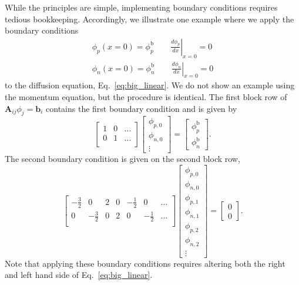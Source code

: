 \documentclass[journal=mamobx,manuscript=suppinfo]{achemso}
\newcommand{\txtb}{\mathrm{b}}
\begin{document}
While the principles are simple, implementing boundary conditions requires tedious bookkeeping.
Accordingly, we illustrate one example where we apply the boundary conditions
\begin{gather}
\phi_{p}(x=0) = \phi_{p}^{\txtb} \qquad \left . \frac{d \phi_{p}}{dx} \right |_{x=0} = 0  \\
\phi_{n}(x=0) = \phi_{n}^{\txtb} \qquad \left . \frac{d \phi_{n}}{dx} \right |_{x=0} = 0 
\end{gather}
to the diffusion equation, Eq.~\ref{eq:big_linear}.
We do not show an example using the momentum equation, but the procedure is identical.
The first block row of $\bm{A}_{ij} \phi_{j} = \bm{b}_{i}$ contains the first boundary condition and is given by
\begin{equation}
\begin{bmatrix}
  1 & 0 & \ldots \\
  0 & 1 & \ldots \\
\end{bmatrix}
\begin{bmatrix}
  \phi_{p, 0} \\
  \phi_{n, 0} \\
  \vdots
\end{bmatrix}
=
\begin{bmatrix}
  \phi_{p}^{\txtb} \\
  \phi_{n}^{\txtb}
\end{bmatrix}
\textrm{.}
\end{equation}
The second boundary condition is given on the second block row,
\begin{equation}
\begin{bmatrix}
  -\frac{3}{2} & 0 & 2 & 0 & -\frac{1}{2} & 0 & \ldots \\
  0 & -\frac{3}{2} & 0 & 2 & 0 & -\frac{1}{2} & \ldots \\
\end{bmatrix}
\begin{bmatrix}
  \phi_{p, 0} \\
  \phi_{n, 0} \\
  \phi_{p, 1} \\
  \phi_{n, 1} \\
  \phi_{p, 2} \\
  \phi_{n, 2} \\
  \vdots
\end{bmatrix}
=
\begin{bmatrix}
  0 \\
  0
\end{bmatrix}
\textrm{.}
\end{equation}
Note that applying these boundary conditions requires altering both the right and left hand side of Eq.~\ref{eq:big_linear}.
\end{document}
